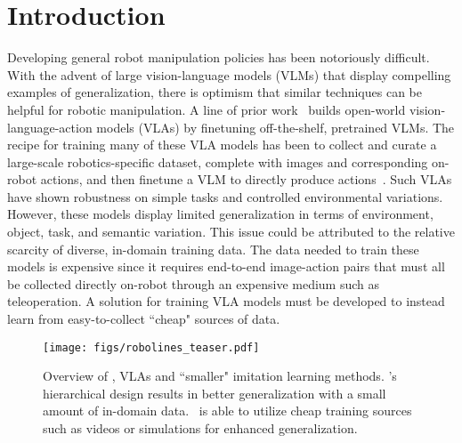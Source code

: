 \section{Introduction}
\begingroup
\renewcommand{\thefootnote}{}
\endgroup
Developing general robot manipulation policies has been notoriously difficult. With the advent of large vision-language models (VLMs) that display compelling examples of generalization, there is optimism that similar techniques can be helpful for robotic manipulation. A line of prior work~\citep{team2024octo, kim2024openvla, gu2023rttrajectory} builds open-world vision-language-action models (VLAs) by finetuning off-the-shelf, pretrained VLMs.  The recipe for training many of these VLA models has been to collect and curate a large-scale robotics-specific dataset, complete with images and corresponding on-robot actions, and then finetune a VLM to directly produce actions~\citep{kim2024openvla,rt22023arxiv}. Such VLAs have shown robustness on simple tasks and controlled environmental variations. However, these models display limited generalization in terms of environment, object, task, and semantic variation. This issue could be attributed to the relative scarcity of diverse, in-domain training data. The data needed to train these models is expensive since it requires end-to-end image-action pairs  that must all be collected directly on-robot through an expensive medium such as teleoperation. A solution for training VLA models must be developed to instead learn from easy-to-collect ``cheap" sources of data. 

\begin{figure*}[t]
    \centering
    \texttt{[image: figs/robolines\_teaser.pdf]}
    \caption{\footnotesize{Overview of \method, VLAs and ``smaller" imitation learning methods. \method 's hierarchical design results in better generalization with a small amount of in-domain data. \method\ is able to utilize cheap training sources such as videos or simulations for enhanced generalization.}}
    \label{fig:teaser}
\vspace{-8mm}
\end{figure*}

